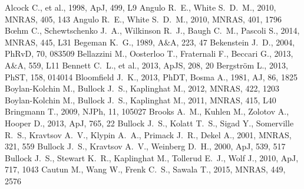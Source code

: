 \documentclass[a4wide,12pt]{book}
\begin{document}
{\begin{thebibliography}{}
Alcock C., et al., 1998, ApJ, 499, L9 
 Angulo R.~E., White S.~D.~M., 2010, MNRAS, 405, 143 
 Angulo R.~E., White S.~D.~M., 2010, MNRAS, 401, 1796 
 B{\oe}hm C., Schewtschenko J.~A., 
Wilkinson R.~J., Baugh C.~M., Pascoli S., 2014, MNRAS, 445, L31 
 Begeman K.~G., 1989, A\&A, 223, 47 
Bekenstein J.~D., 2004, PhRvD, 70, 083509 
 Bellazzini M., Oosterloo T., Fraternali F., Beccari G., 2013, A\&A, 559, L11 
 Bennett C.~L., et al., 2013, ApJS, 208, 20 
Bergstr{\"o}m L., 2013, PhST, 158, 014014
Bloomfield J.~K., 2013, PhDT, 
 Bosma 
A., 1981, AJ, 86, 1825 
 Boylan-Kolchin M., Bullock J.~S., Kaplinghat M., 2012, MNRAS, 422, 1203 
 Boylan-Kolchin M., Bullock J.~S., Kaplinghat M., 2011, MNRAS, 415, L40 
Bringmann T., 2009, NJPh, 11, 105027 
Brooks A.~M., Kuhlen M., Zolotov A., Hooper D., 2013, ApJ, 765, 22 
 Bullock J.~S., Kolatt T.~S., Sigad Y., 
Somerville R.~S., Kravtsov A.~V., Klypin A.~A., Primack J.~R., Dekel A., 
2001, MNRAS, 321, 559 
 Bullock J.~S., Kravtsov A.~V., Weinberg D.~H., 2000, ApJ, 539, 517 
 Bullock J.~S., Stewart K.~R., Kaplinghat 
M., Tollerud E.~J., Wolf J., 2010, ApJ, 717, 1043 
Cautun M., Wang W., Frenk C.~S., Sawala T., 2015, MNRAS, 449, 2576

\end{thebibliography}}
\end{document}

